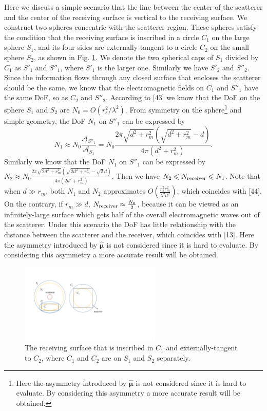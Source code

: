 \documentclass[a4paper,12pt]{article}
\begin{document}
\begin{framed}
{    \quad Here we discuss a simple scenario that the line between the center of the scatterer and the center of the receiving surface is vertical to the receiving surface. We construct two spheres concentric with the scatterer region. These spheres satisfy the condition that the receiving surface is inscribed in a circle $C_1$ on the large sphere $S_1$, and its four sides are externally-tangent to a circle $C_2$ on the small sphere $S_2$, as shown in Fig. \ref{fig_circles}. We denote the two spherical caps of $S_1$ divided by $C_1$ as $S'_1$ and $S''_1$, where $S'_1$ is the larger one. Similarly we have $S'_2$ and $S''_2$. Since the information flows through any closed surface that encloses the scatterer should be the same, we know that the electromagnetic fields on $C_1$ and $S''_1$ have the same DoF, so as $C_2$ and $S''_2$. According to [43] we know that the DoF on the sphere $S_1$ and $S_2$ are $N_0 = O(r_s^2/\lambda^2)$.} {\color{red}From symmetry on the sphere\footnote{\color{red}Here the asymmetry introduced by $\hat{\boldsymbol{\mu}}$ is not considered since it is hard to evaluate. By considering this asymmetry a more accurate result will be obtained.} and simple geometry, the DoF $N_1$ on $S''_1$ can be expressed by
    \begin{equation}
        N_1 \approx N_0\frac{\mathcal{A}_{S''_1}}{\mathcal{A}_{S_1}}= N_0\frac{2\pi\sqrt{d^2+r_m^2}(\sqrt{d^2+r_m^2}-d)}{4\pi(d^2+r_m^2)}.
    \end{equation}
    Similarly we know that the DoF $N_1$ on $S''_1$ can be expressed by $N_2 \approx N_0 \frac{2\pi\sqrt{2d^2+r_m^2}(\sqrt{2d^2+r_m^2}-\sqrt{2}d)}{4\pi(2d^2+r_m^2)}$.
    Then we have $N_2\leqslant N_{\rm receiver} \leqslant N_1$. Note that when $d\gg r_m$, both $N_1$ and $N_2$ approximates $O(\frac{r_s^2r_m^2}{\lambda^2d^2})$, which coincides with [44]. On the contrary, if $r_m \gg d$, $N_{\rm receiver} \approx \frac{N_0}{2}$, because it can be viewed as an infinitely-large surface which gets half of the overall electromagnetic waves out of the scatterer. Under this scenario the DoF has little relationship with the distance between the scatterer and the receiver, which coincides with [13]. Here the asymmetry introduced by $\hat{\boldsymbol{\mu}}$ is not considered since it is hard to evaluate. By considering this asymmetry a more accurate result will be obtained.
    }
    
    \begin{figure}[H]
          \centering 
          \includegraphics[width=0.6\textwidth]{figs/circles.pdf} 
          \caption{\color{red}The receiving surface that is inscribed in $C_1$ and externally-tangent to $C_2$, where $C_1$ and $C_2$ are on $S_1$ and $S_2$ separately.} 
          \label{fig_circles}
      \end{figure}
    

\end{framed}
\end{document}
